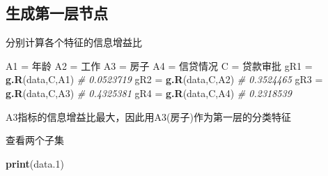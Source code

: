 \documentclass[
]{ctexart}
\newenvironment{Shaded}{\begin{snugshade}}{\end{snugshade}}
\newcommand{\CommentTok}[1]{\textcolor[rgb]{0.56,0.35,0.01}{\textit{#1}}}
\newcommand{\FloatTok}[1]{\textcolor[rgb]{0.00,0.00,0.81}{#1}}
\newcommand{\FunctionTok}[1]{\textcolor[rgb]{0.13,0.29,0.53}{\textbf{#1}}}
\newcommand{\NormalTok}[1]{#1}
\newcommand{\OtherTok}[1]{\textcolor[rgb]{0.56,0.35,0.01}{#1}}
\newcommand{\SpecialCharTok}[1]{\textcolor[rgb]{0.81,0.36,0.00}{\textbf{#1}}}
\newcommand{\StringTok}[1]{\textcolor[rgb]{0.31,0.60,0.02}{#1}}
\begin{document}
\hypertarget{ux751fux6210ux7b2cux4e00ux5c42ux8282ux70b9}{%
\subsection{生成第一层节点}\label{ux751fux6210ux7b2cux4e00ux5c42ux8282ux70b9}}

分别计算各个特征的信息增益比

\begin{Shaded}
\begin{Highlighting}[]
\NormalTok{A1 }\OtherTok{=} \StringTok{\textquotesingle{}年龄\textquotesingle{}}
\NormalTok{A2 }\OtherTok{=} \StringTok{\textquotesingle{}工作\textquotesingle{}}
\NormalTok{A3 }\OtherTok{=} \StringTok{\textquotesingle{}房子\textquotesingle{}}
\NormalTok{A4 }\OtherTok{=} \StringTok{\textquotesingle{}信贷情况\textquotesingle{}}
\NormalTok{C }\OtherTok{=} \StringTok{\textquotesingle{}贷款审批\textquotesingle{}}
\NormalTok{gR1 }\OtherTok{=} \FunctionTok{g.R}\NormalTok{(data,C,A1) }\CommentTok{\# 0.0523719}
\NormalTok{gR2 }\OtherTok{=} \FunctionTok{g.R}\NormalTok{(data,C,A2) }\CommentTok{\# 0.3524465}
\NormalTok{gR3 }\OtherTok{=} \FunctionTok{g.R}\NormalTok{(data,C,A3) }\CommentTok{\# 0.4325381}
\NormalTok{gR4 }\OtherTok{=} \FunctionTok{g.R}\NormalTok{(data,C,A4) }\CommentTok{\# 0.2318539}
\end{Highlighting}
\end{Shaded}

A3指标的信息增益比最大，因此用A3(房子)作为第一层的分类特征

\begin{Shaded}
\end{Shaded}

查看两个子集

\begin{Shaded}
\begin{Highlighting}[]
\FunctionTok{print}\NormalTok{(data}\FloatTok{.1}\NormalTok{)}
\end{Highlighting}
\end{Shaded}
\end{document}
